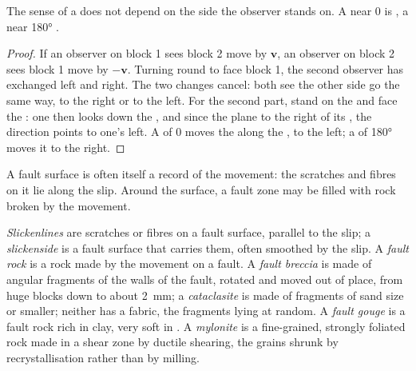 \begin{proposition}\label{prop:b1:faults-folds-fabrics:sense}
The sense of a  does not depend on the side the observer
stands on. A  near $0$ is , a  near \ang{180} .
\end{proposition}

\begin{proof}
If an observer on block 1 sees block 2 move by $\mathbf v$, an observer on
block 2 sees block 1 move by $-\mathbf v$. Turning round to face block 1, the
second observer has exchanged left and right. The two changes cancel: both
see the other side go the same way, to the right or to the left. For the
second part, stand on the  and face the : one then looks
down the , and since the plane  to the right of its ,
the  direction points to one's left. A  of $0$ moves the 
along the , to the left; a  of \ang{180} moves it to the right.
\end{proof}

A fault surface is often itself a record of the movement: the scratches and
fibres on it lie along the slip. Around the surface, a fault zone may be filled
with rock broken by the movement.

\begin{definition}\label{def:b1:faults-folds-fabrics:fault-rocks}
\emph{Slickenlines} are scratches or fibres on a fault
surface, parallel to the slip; a \emph{slickenside} is a
fault surface that carries them, often smoothed by the slip. A \emph{fault
rock} is a rock made by the movement on a fault. A
\emph{fault breccia} is made of angular fragments of the
walls of the fault, rotated and moved out of place, from huge blocks down to
about \qty{2}{mm}; a \emph{cataclasite} is made of
fragments of sand size or smaller; neither has a fabric, the fragments lying
at random. A \emph{fault gouge} is a fault rock rich in
clay, very soft in . A \emph{mylonite} is a
fine-grained, strongly foliated rock made in a shear zone by ductile shearing,
the grains shrunk by recrystallisation rather than by milling.
\end{definition}

